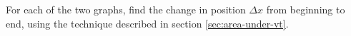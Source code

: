 For each of the two graphs, find the change in position $\Delta x$ from
beginning to end, using the technique described in section \ref{sec:area-under-vt}.\answercheck
